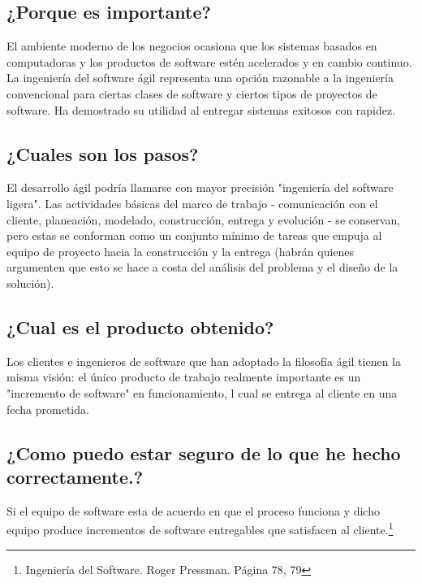 			\subsection{¿Porque es importante?}
			El ambiente moderno de los negocios ocasiona que los sistemas basados en computadoras y los productos de software estén acelerados y en cambio continuo. La ingeniería del software ágil representa una opción razonable a la ingeniería convencional para ciertas clases de software y ciertos tipos de proyectos de software. Ha demostrado su utilidad al entregar sistemas exitosos con rapidez.
			\subsection{¿Cuales son los pasos?}
			El desarrollo ágil podría llamarse con mayor precisión "ingeniería del software ligera". Las actividades básicas del marco de trabajo - comunicación con el cliente, planeación, modelado, construcción, entrega y evolución - se conservan, pero estas se conforman como un conjunto mínimo de tareas que empuja al equipo de proyecto hacia la construcción y la entrega (habrán quienes argumenten que esto se hace a costa del análisis del problema y el diseño de la solución).
			\subsection{¿Cual es el producto obtenido?}
			Los clientes e ingenieros de software que han adoptado la filosofía ágil tienen la misma visión: el único producto de trabajo realmente importante es un "incremento de software" en funcionamiento, l cual se entrega al cliente en una fecha prometida.
			\subsection{¿Como puedo estar seguro de lo que he hecho correctamente.?}
			Si el equipo de software esta de acuerdo en que el proceso funciona y dicho equipo produce incrementos de software entregables que satisfacen al cliente.\footnote{Ingeniería del Software. Roger Pressman. Página 78, 79}
